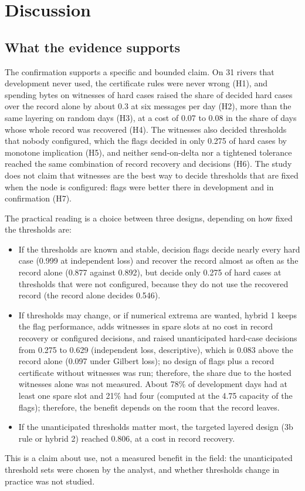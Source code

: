 \section{Discussion}
\label{sec:discussion}

\subsection{What the evidence supports}
The confirmation supports a specific and bounded claim. On 31 rivers that development never used, the certificate rules were never wrong (H1), and spending bytes on witnesses of hard cases raised the share of decided hard cases over the record alone by about 0.3 at six messages per day (H2), more than the same layering on random days (H3), at a cost of 0.07 to 0.08 in the share of days whose whole record was recovered (H4). The witnesses also decided thresholds that nobody configured, which the flags decided in only 0.275 of hard cases by monotone implication (H5), and neither send-on-delta nor a tightened tolerance reached the same combination of record recovery and decisions (H6). The study does not claim that witnesses are the best way to decide thresholds that are fixed when the node is configured: flags were better there in development and in confirmation (H7).

The practical reading is a choice between three designs, depending on how fixed the thresholds are:
\begin{itemize}
  \item If the thresholds are known and stable, decision flags decide nearly every hard case (0.999 at independent loss) and recover the record almost as often as the record alone (0.877 against 0.892), but decide only 0.275 of hard cases at thresholds that were not configured, because they do not use the recovered record (the record alone decides 0.546).
  \item If thresholds may change, or if numerical extrema are wanted, hybrid 1 keeps the flag performance, adds witnesses in spare slots at no cost in record recovery or configured decisions, and raised unanticipated hard-case decisions from 0.275 to 0.629 (independent loss, descriptive), which is 0.083 above the record alone (0.097 under Gilbert loss); no design of flags plus a record certificate without witnesses was run; therefore, the share due to the hosted witnesses alone was not measured. About 78\% of development days had at least one spare slot and 21\% had four (computed at the 4.75 capacity of the flags); therefore, the benefit depends on the room that the record leaves.
  \item If the unanticipated thresholds matter most, the targeted layered design (3b rule or hybrid 2) reached 0.806, at a cost in record recovery.
\end{itemize}
This is a claim about use, not a measured benefit in the field: the unanticipated threshold sets were chosen by the analyst, and whether thresholds change in practice was not studied.

